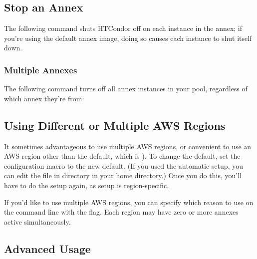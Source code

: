 
\subsection{Stop an Annex}

The following command shuts HTCondor off on each instance in the annex; if
you're using the default annex image, doing so causes each instance to shut
itself down.


\subsubsection{Multiple Annexes}

The following command turns off all annex instances in your pool, regardless
of which annex they're from:


\subsection{Using Different or Multiple AWS Regions}

It sometimes advantageous to use multiple AWS regions, or convenient to use
an AWS region other than the default, which is ).  To change
the default, set the configuration macro 
to the new default.  (If you used the  automatic setup, you
can edit the  file in  directory in
your home directory.)  Once you do this, you'll have to do the setup again,
as setup is region-specific.

If you'd like to use multiple AWS regions, you can specify which reason to use
on the command line with the  flag.  Each region may have
zero or more annexes active simultaneously.

\subsection{Advanced Usage}

